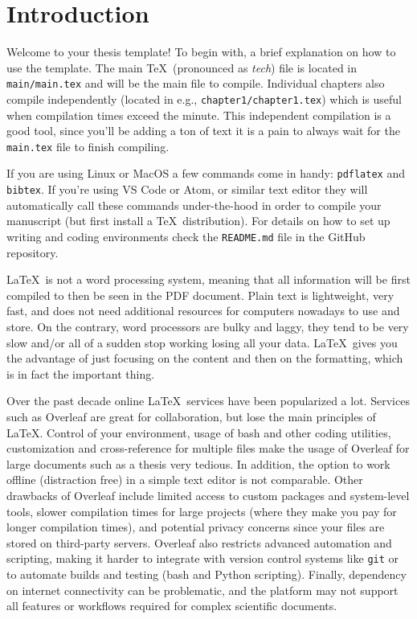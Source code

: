 
\chapter{Introduction}

Welcome to your thesis template! To begin with, a brief explanation on how to use the template. The main \TeX\ (pronounced as \textit{tech}) file is located in \texttt{main/main.tex} and will be the main file to compile. Individual chapters also compile independently (located in e.g., \texttt{chapter1/chapter1.tex}) which is useful when compilation times exceed the minute. This independent compilation is a good tool, since you'll be adding a ton of text it is a pain to always wait for the \texttt{main.tex} file to finish compiling.

If you are using Linux or MacOS a few commands come in handy: \texttt{pdflatex} and \texttt{bibtex}. If you're using VS Code or Atom, or similar text editor they will automatically call these commands under-the-hood in order to compile your manuscript (but first install a \TeX\ distribution). For details on how to set up writing and coding environments check the \texttt{README.md} file in the GitHub repository.

\LaTeX\ is not a word processing system, meaning that all information will be first compiled to then be seen in the PDF document. Plain text is lightweight, very fast, and does not need additional resources for computers nowadays to use and store. On the contrary, word processors are bulky and laggy, they tend to be very slow and/or all of a sudden stop working losing all your data. \LaTeX\ gives you the advantage of just focusing on the content and then on the formatting, which is in fact the important thing.

Over the past decade online \LaTeX\ services have been popularized a lot. Services such as Overleaf are great for collaboration, but lose the main principles of \LaTeX. Control of your environment, usage of bash and other coding utilities, customization and cross-reference for multiple files make the usage of Overleaf for large documents such as a thesis very tedious. In addition, the option to work offline (distraction free) in a simple text editor is not comparable.
%
Other drawbacks of Overleaf include limited access to custom packages and system-level tools, slower compilation times for large projects (where they make you pay for longer compilation times), and potential privacy concerns since your files are stored on third-party servers. Overleaf also restricts advanced automation and scripting, making it harder to integrate with version control systems like \texttt{git} or to automate builds and testing (bash and Python scripting). Finally, dependency on internet connectivity can be problematic, and the platform may not support all features or workflows required for complex scientific documents.

